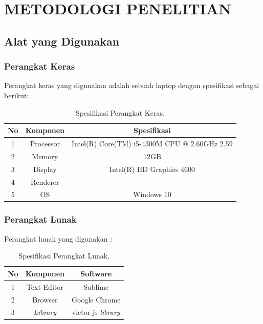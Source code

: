%
\chapter{METODOLOGI PENELITIAN}\label{cha:metodologi}
\section{Alat yang Digunakan}\label{sec:alat}
\subsection{Perangkat Keras}\label{sec:perangkatk}
\hspace{0.6cm}Perangkat keras yang digunakan adalah sebuah laptop dengan spesifikasi sebagai
berikut:

\begin{table}
\centering
\caption{Spesifikasi Perangkat Keras.}
\begin{center}
\begin{tabular}{|c|c|c|}
\hline
No & Komponen & Spesifikasi \\
\hline
1 & Processor & Intel(R) Core(TM) i5-4300M CPU @ 2.60GHz 2.59 \\
\hline
2 & Memory & 12GB \\
\hline
3 & Display & Intel(R) HD Graphics 4600 \\
\hline
4 & Renderer & - \\
\hline
5 & OS & Windows 10 \\
\hline
\end{tabular}
\end{center}
\end{table}

\subsection{Perangkat Lunak}\label{sec:perangkatl}
\hspace{0.6cm}Perangkat lunak yang digunakan :

\begin{table}
\centering
\caption{Spesifikasi Perangkat Lunak.}
\begin{center}
\begin{tabular}{|c|c|c|}
\hline
No & Komponen & Software \\
\hline
1 & Text Editor & Sublime \\
\hline
2 & Browser & Google Chrome \\
\hline
3 & \emph{Library} & victor js \emph{library} \\
\hline
\end{tabular}
\end{center}
\end{table}

